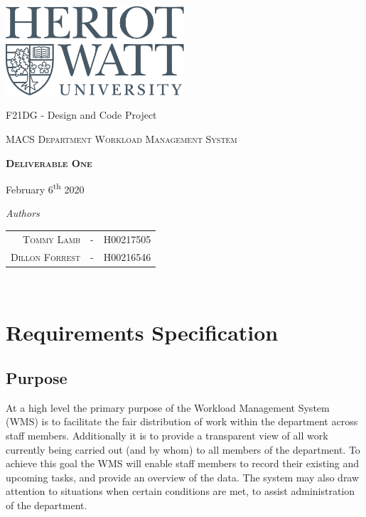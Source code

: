 \documentclass[11pt, a4paper]{article}
\begin{document}
\begin{titlepage}
	\thispagestyle{empty}
	{\centering
		\includegraphics[width=0.5\textwidth]{heriot-watt-logo.png}\par\vspace{1cm}
		\vspace{1cm}
		{\LARGE F21DG - Design and Code Project\par}
		{\LARGE \par}
		\vspace{1.5cm}
		{\scshape\Large MACS Department Workload Management System\par}
		\vspace{1.5cm}
		{\scshape\LARGE\bfseries Deliverable One \par}

		\vspace{3.5cm}
			\begin{center}
					February 6\textsuperscript{th} 2020
			\end{center}
		\textit{Authors}\par
		\begin{tabular}{rcl}
			\\ \textsc{Tommy Lamb} & - & H00217505\\
			\textsc{Dillon Forrest} & - & H00216546\\
		\end{tabular} \\
	
	}
\end{titlepage}

\section{Requirements Specification}

\subsection{Purpose}
At a high level the primary purpose of the Workload Management System (WMS) is to facilitate the fair distribution of work within the department across staff members. Additionally it is to provide a transparent view of all work currently being carried out (and by whom) to all members of the department. To achieve this goal the WMS will enable staff members to record their existing and upcoming tasks, and provide an overview of the data. The system may also draw attention to situations when certain conditions are met, to assist administration of the department.
\end{document}
